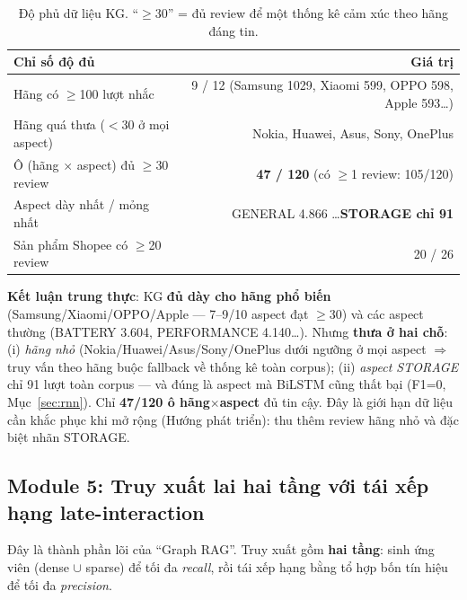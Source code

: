 \documentclass[12pt,a4paper]{article}
\begin{document}
\begin{table}[H]
\centering
\caption{Độ phủ dữ liệu KG. ``$\geq$30'' = đủ review để một thống kê cảm xúc theo hãng đáng tin.}
\begin{tabular}{lr}
\toprule
\textbf{Chỉ số độ đủ} & \textbf{Giá trị} \\
\midrule
Hãng có $\geq$100 lượt nhắc & 9 / 12 (Samsung 1029, Xiaomi 599, OPPO 598, Apple 593\ldots) \\
Hãng quá thưa ($<$30 ở mọi aspect) & Nokia, Huawei, Asus, Sony, OnePlus \\
Ô (hãng $\times$ aspect) đủ $\geq$30 review & \textbf{47 / 120} (có $\geq$1 review: 105/120) \\
Aspect dày nhất / mỏng nhất & GENERAL 4.866 \ldots \textbf{STORAGE chỉ 91} \\
Sản phẩm Shopee có $\geq$20 review & 20 / 26 \\
\bottomrule
\end{tabular}
\end{table}

\noindent\textbf{Kết luận trung thực}: KG \textbf{đủ dày cho hãng phổ biến} (Samsung/Xiaomi/OPPO/Apple --- 7--9/10 aspect đạt $\geq$30) và các aspect thường (BATTERY 3.604, PERFORMANCE 4.140\ldots). Nhưng \textbf{thưa ở hai chỗ}: (i) \textit{hãng nhỏ} (Nokia/Huawei/Asus/Sony/OnePlus dưới ngưỡng ở mọi aspect $\Rightarrow$ truy vấn theo hãng buộc fallback về thống kê toàn corpus); (ii) \textit{aspect STORAGE} chỉ 91 lượt toàn corpus --- và đúng là aspect mà BiLSTM cũng thất bại (F1=0, Mục~\ref{sec:rnn}). Chỉ \textbf{47/120 ô hãng$\times$aspect} đủ tin cậy. Đây là giới hạn dữ liệu cần khắc phục khi mở rộng (Hướng phát triển): thu thêm review hãng nhỏ và đặc biệt nhãn STORAGE.

\subsection{Module 5: Truy xuất lai hai tầng với tái xếp hạng late-interaction}
\label{sec:module5}

Đây là thành phần lõi của ``Graph RAG''. Truy xuất gồm \textbf{hai tầng}: sinh ứng viên (dense $\cup$ sparse) để tối đa \textit{recall}, rồi tái xếp hạng bằng tổ hợp bốn tín hiệu để tối đa \textit{precision}.
\end{document}
